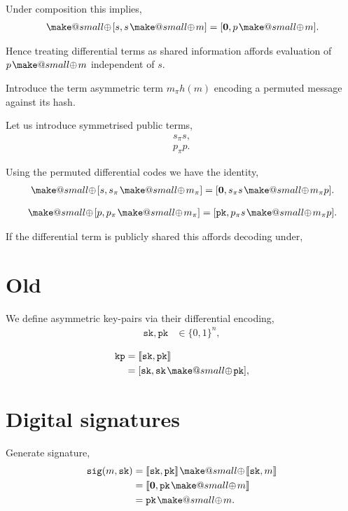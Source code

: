 \documentclass[twocolumn, aps, amsmath, amssymb, nofootinbib, superscriptaddress, longbibliography, doublefloatfix, table-of-contents, eqsecnum, rmp]{revtex4-2}
\makeatletter
\def\sk{\mathtt{sk}}
\def\pk{\mathtt{pk}}
\def\kp{\mathtt{kp}}
\def\sig{\mathtt{sig}}
\def\diff#1#2{\llbracket #1,#2\rrbracket}
\newcommand{\soplus}{{{\hspace{1pt}}{\mathbin{\mathpalette\make@small\oplus}}}{\hspace{1pt}}}
\newcommand{\make@small}[2]{%
  \vcenter{\hbox{%
    \scalebox{0.6}{$\m@th#1#2$}%
  }}%
}
\makeatother
\begin{document}
Under composition this implies,
\begin{align}
	[s,s\soplus p] \soplus [s,s\soplus m] = [\mathbf{0},p\soplus m].	
\end{align}

Hence treating differential terms as shared information affords evaluation of $p\soplus m$ independent of $s$.

Introduce the term asymmetric term $m_\pi h(m)$ encoding a permuted message against its hash.


Let us introduce symmetrised public terms,
\begin{align}
	s_\pi s, \nonumber\\
	p_\pi p.	
\end{align}

Using the permuted differential codes we have the identity,
\begin{align}
	[s,s \soplus p] \soplus [s, s_\pi \soplus m_\pi] = [\mathbf{0}, s_\pi s \soplus m_\pi p].
\end{align}

\begin{align}
	[s,s \soplus p] \soplus [p,p_\pi \soplus m_\pi] = [\mathtt{pk}, p_\pi s \soplus m_\pi p].
\end{align}

If the differential term is publicly shared this affords decoding under,

\section{Old}

We define asymmetric key-pairs via their differential encoding,
\begin{align}
	\mathtt{sk}, \mathtt{pk} &\in \{0,1\}^n,
\end{align}

\begin{align}
	\kp &= \diff{\sk}{\pk} \nonumber\\
	&= [\sk,\sk \soplus \pk],
\end{align}

\section{Digital signatures}

Generate signature,
\begin{align}
	\sig(m,\sk) &= \diff{\sk}{\pk} \soplus \diff{\sk}{m} \nonumber\\
	&= \diff{\mathbf{0}}{\pk\soplus m} \nonumber\\
	&= \pk \soplus m.
\end{align}
\end{document}
